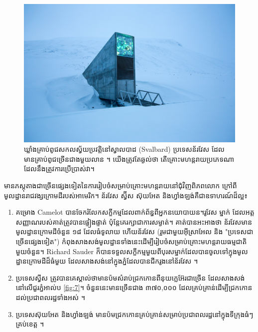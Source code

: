 \documentclass[10pt,twocolumn,letterpaper]{article}
\begin{document}
\begin{figure}[t]
\begin{center}
   \includegraphics[width=1\linewidth]{svalbard.jpg}
\end{center}
   \caption{ឃ្លាំងគ្រាប់ពូជសកលស្វ័យប្រវត្តិនៅស្វាលបាដ (Svalbard) ប្រទេសន័រវែស ដែលមានគ្រាប់ពូជច្រើនជាងមួយលាន \cite{24}។ យើងត្រូវតែឆ្ងល់ថា តើគ្រោះមហន្តរាយប្រភេទណាដែលនឹងត្រូវការប្រើប្រាស់វា។}
\label{fig:8}
\label{fig:onecol}
\end{figure}

មានភស្តុតាងជាច្រើនផ្សេងទៀតនៃការរៀបចំសម្រាប់គ្រោះមហន្តរាយនៅជុំវិញពិភពលោក ក្រៅពីមូលដ្ឋានរាជវង្សក្រោមដីរបស់អាមេរិក។ ន័រវែស ស្វ៊ីស ស៊ុយអែត និងហ្វាំងឡង់គឺជាឧទាហរណ៍ដ៏ល្អ៖

\begin{flushleft}
\begin{enumerate}
    \item គម្រោង Camelot បានចែករំលែកសក្ខីកម្មដែលពាក់ព័ន្ធពីអ្នកនយោបាយន។រូវែស ម្នាក់ \cite{25,26} ដែលអត្តសញ្ញាណរបស់គាត់ត្រូវបានផ្ទៀងផ្ទាត់ ប៉ុន្តែគេរក្សាជាការសម្ងាត់។ គាត់បានអះអាងថា ន័រវែសមានមូលដ្ឋានក្រោមដីចំនួន ១៨ ដែលធំទូលាយ ហើយន័រវែស (រួមជាមួយអ៊ីស្រាអែល និង "ប្រទេសជាច្រើនផ្សេងទៀត") កំពុងសាងសង់មូលដ្ឋានទាំងនេះដើម្បីរៀបចំសម្រាប់គ្រោះមហន្តរាយធម្មជាតិមួយចំនួន។ Richard Sauder ក៏បានទទួលសក្ខីកម្មមួយពីបុរសម្នាក់ដែលបានចូលទៅក្នុងមូលដ្ឋានក្រោមដីដ៏ធំមួយ ដែលសាងសង់នៅក្នុងភ្នំដែលបានជីករូងនៅន័រវែស \cite{22}។
    \item ប្រទេសស្វីស ត្រូវបានគេស្គាល់ថាមានប៉មសំរាប់ជ្រកកោនពីនុយក្លេអ៊ែរជាច្រើន ដែលសាងសង់នៅលើជួរភ្នំអាល់ប \ref{fig:7}។ ចំនួននេះមានច្រើនជាង ៣៧០,០០០ ដែលគ្រប់គ្រាន់ដើម្បីជ្រកកោនដល់ប្រជាពលរដ្ឋទាំងអស់ \cite{27}។
    \item ប្រទេសស៊ុយអែត និងហ្វាំងឡង់ មានប៉មជ្រកកោនគ្រប់គ្រាន់សម្រាប់ប្រជាពលរដ្ឋនៅក្នុងទីក្រុងធំៗគ្រប់ខេត្ត \cite{27}។
\end{enumerate}
\end{flushleft}
\end{document}
